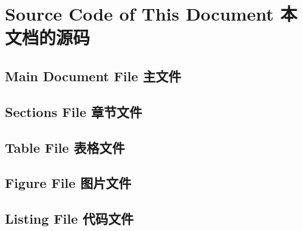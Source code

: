 \section{Source Code of This Document 本文档的源码}

\subsection{Main Document File 主文件}



\subsection{Sections File 章节文件}




\subsection{Table File 表格文件}


\subsection{Figure File 图片文件}
 
 

 

\subsection{Listing File 代码文件}
 
 
 
 
 
 
 

